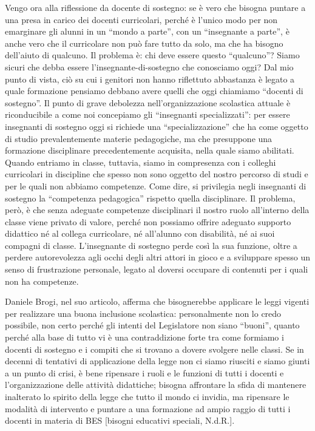 Vengo ora alla riflessione da docente di sostegno: se è vero che bisogna puntare a una presa in carico dei docenti curricolari, perché è l'unico modo per non emarginare gli alunni in un “mondo a parte”, con un “insegnante a parte”, è anche vero che il curricolare non può fare tutto da solo, ma che ha bisogno dell'aiuto di qualcuno. Il problema è: chi deve essere questo “qualcuno”? Siamo sicuri che debba essere l'insegnante-di-sostegno che conosciamo oggi?
Dal mio punto di vista, ciò su cui i genitori non hanno riflettuto abbastanza è legato a quale formazione pensiamo debbano avere quelli che oggi chiamiamo “docenti di sostegno”.
Il punto di grave debolezza nell'organizzazione scolastica attuale è riconducibile a come noi concepiamo gli “insegnanti specializzati”: per essere insegnanti di sostegno oggi si richiede una “specializzazione” che ha come oggetto di studio prevalentemente materie pedagogiche, ma che presuppone una formazione disciplinare precedentemente acquisita, nella quale siamo abilitati. Quando entriamo in classe, tuttavia, siamo in compresenza con i colleghi curricolari in discipline che spesso non sono oggetto del nostro percorso di studi e  per le quali non abbiamo competenze. Come dire, si privilegia negli insegnanti di sostegno la “competenza pedagogica” rispetto quella disciplinare. Il problema, però, è che senza adeguate competenze disciplinari il nostro ruolo all'interno della classe viene privato di valore, perché non possiamo offrire adeguato supporto didattico né al collega curricolare, né all'alunno con disabilità, né ai suoi compagni di classe. L'insegnante di sostegno perde così la sua funzione, oltre a perdere autorevolezza agli occhi degli altri attori in gioco e a sviluppare spesso un senso di frustrazione personale, legato al doversi occupare di contenuti per i quali non ha competenze.

Daniele Brogi, nel suo articolo, afferma che bisognerebbe applicare le leggi vigenti per realizzare una buona inclusione scolastica: personalmente non lo credo possibile, non certo perché gli intenti del Legislatore non siano “buoni”, quanto perché alla base di tutto vi è una contraddizione forte tra come formiamo i docenti di sostegno e i compiti che si trovano a dovere svolgere nelle classi. Se in decenni di tentativi di applicazione della legge non ci siamo riusciti e siamo giunti a un punto di crisi, è bene ripensare i ruoli e le funzioni di tutti i docenti e l'organizzazione delle attività didattiche; bisogna affrontare la sfida di mantenere inalterato lo spirito della legge che tutto il mondo ci invidia, ma ripensare le modalità di intervento e puntare a una formazione ad ampio raggio di tutti i docenti in materia di BES [bisogni educativi speciali, N.d.R.].

